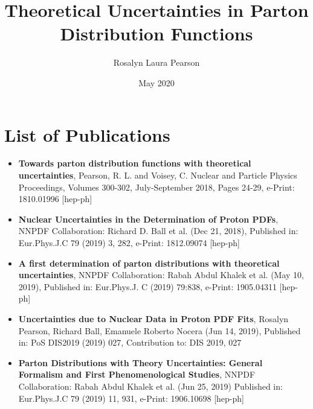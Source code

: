 \documentclass[a4paper,12pt,oneside,openright]{book}
\title{Theoretical Uncertainties in Parton Distribution Functions}
\author{Rosalyn Laura Pearson}
\date{May 2020} %
\newcommand{\bi}{\begin{itemize}}
\newcommand{\ei}{\end{itemize}}
\numberwithin{equation}{section}
\numberwithin{figure}{section}
\numberwithin{table}{section}
\begin{document}
\singlespacing
\maketitlepage
\frontmatter
\eighteenptleading


\singlespacing
\declarationpublications{\cite{ }}
\makedeclaration



\tableofcontents

\cleardoublepage
{}
{}
\setcounter{tocdepth}{2}
\tableofcontents

\cleardoublepage
{}
{}
\listoffigures

\cleardoublepage
{}
{}
\listoftables
\section{List of Publications}
\bi
\item {\bf Towards parton distribution functions with theoretical uncertainties}, Pearson, R. L. and Voisey, C. Nuclear and Particle Physics Proceedings, Volumes 300-302, July-September 2018, Pages 24-29, e-Print: 1810.01996 [hep-ph]
\item {\bf Nuclear Uncertainties in the Determination of Proton PDFs}, NNPDF Collaboration: Richard D. Ball et al. (Dec 21, 2018), Published in: Eur.Phys.J.C 79 (2019) 3, 282, e-Print: 1812.09074 [hep-ph]
\item {\bf A first determination of parton distributions with theoretical uncertainties}, NNPDF Collaboration: Rabah Abdul Khalek et al. (May 10, 2019), Published in: Eur.Phys.J. C (2019) 79:838, e-Print: 1905.04311 [hep-ph]
\item {\bf Uncertainties due to Nuclear Data in Proton PDF Fits}, Rosalyn Pearson, Richard Ball, Emanuele Roberto Nocera (Jun 14, 2019), Published in: PoS DIS2019 (2019) 027, Contribution to: DIS 2019, 027  
\item {\bf Parton Distributions with Theory Uncertainties: General Formalism and First Phenomenological Studies}, NNPDF Collaboration: Rabah Abdul Khalek et al. (Jun 25, 2019) Published in: Eur.Phys.J.C 79 (2019) 11, 931, e-Print: 1906.10698 [hep-ph]
\ei
\end{document}
